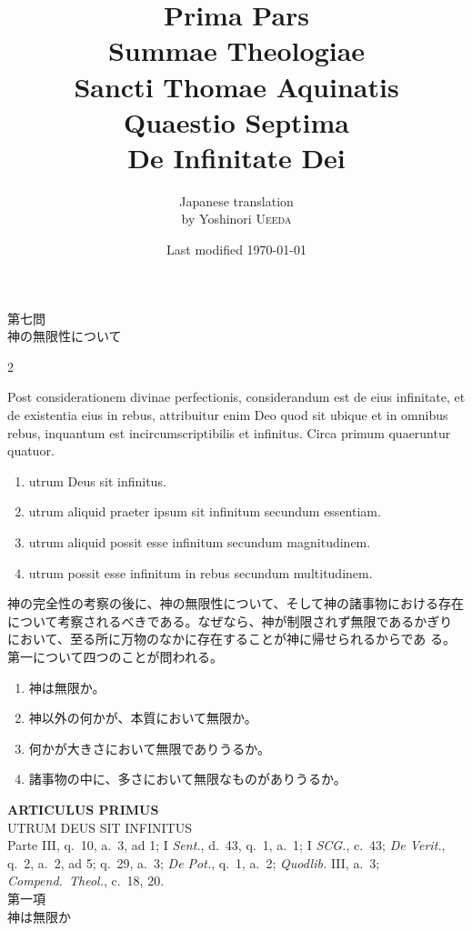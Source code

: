 \documentclass[paper=a4paper,fontsize=10pt,jafontsize=9pt,titlepage]{jlreq}
\title{{\bfseries Prima Pars}\\{\Huge Summae Theologiae}\\Sancti Thomae
Aquinatis\\Quaestio Septima\\{\bfseries De Infinitate Dei}}
\author{Japanese translation\\by Yoshinori {\scshape Ueeda}}
\date{Last modified \today}
\begin{document}
\maketitle

\begin{center}
 {\Large 第七問\\神の無限性について}
\end{center}

\begin{paracol}{2}

Post considerationem divinae perfectionis, considerandum est de eius
 infinitate, et de existentia eius in rebus, attribuitur enim Deo quod
 sit ubique et in omnibus rebus, inquantum est incircumscriptibilis et
 infinitus. Circa primum quaeruntur quatuor. 


\begin{enumerate}
 \item utrum Deus sit
 infinitus.
 \item utrum aliquid praeter ipsum sit infinitum secundum
 essentiam.
 \item utrum aliquid possit esse infinitum secundum
 magnitudinem.
 \item utrum possit esse infinitum in rebus secundum
 multitudinem.
\end{enumerate}

\switchcolumn

神の完全性の考察の後に、神の無限性について、そして神の諸事物における存在
 について考察されるべきである。なぜなら、神が制限されず無限であるかぎり
 において、至る所に万物のなかに存在することが神に帰せられるからであ
 る。第一について四つのことが問われる。

\begin{enumerate}
 \item 神は無限か。
 \item 神以外の何かが、本質において無限か。
 \item 何かが大きさにおいて無限でありうるか。
 \item 諸事物の中に、多さにおいて無限なものがありうるか。
\end{enumerate}

\end{paracol}

\newpage
{}
\begin{center}
 {\Large {\bfseries ARTICULUS PRIMUS}}\\
 {\large UTRUM DEUS SIT INFINITUS}\\
 {\footnotesize Parte III, q.~10, a.~3, ad 1; I {\itshape Sent.}, d.~43,
 q.~1, a.~1; I {\itshape SCG.}, c.~43; {\itshape De Verit.}, q.~2, a.~2,
 ad 5; q.~29, a.~3; {\itshape De Pot.}, q.~1, a.~2; {\itshape Quodlib.}
 III, a.~3; {\itshape Compend.~Theol.}, c.~18, 20.}\\
 {\Large 第一項\\神は無限か}
\end{center}
\end{document}
